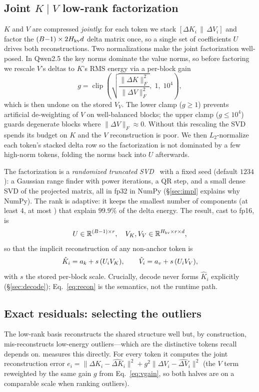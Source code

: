 \subsection{Joint $K\!\mid\!V$ low-rank factorization}
$K$ and $V$ are compressed \emph{jointly}: for each token we stack $[\Delta K_i \,\|\, \Delta V_i]$
and factor the $(B{-}1)\times 2H_{\mathrm{kv}}d$ delta matrix once, so a single set of coefficients
$U$ drives both reconstructions. Two normalizations make the joint factorization well-posed. In
Qwen2.5 the key norms dominate the value norms, so before factoring we rescale $V$'s deltas to
$K$'s RMS energy via a per-block gain
\begin{equation}
  g = \operatorname{clip}\!\left(\sqrt{\frac{\|\Delta K\|_F^2}{\|\Delta V\|_F^2}},\;1,\;10^4\right),
  \label{eq:vgain}
\end{equation}
which is then undone on the stored $V_V$. The lower clamp ($g\ge 1$) prevents artificial
de-weighting of $V$ on well-balanced blocks; the upper clamp ($g\le 10^4$) guards degenerate
blocks where $\|\Delta V\|_F\approx 0$. Without this rescaling the SVD spends its budget on $K$
and the $V$ reconstruction is poor. We then $L_2$-normalize each token's stacked delta row so the
factorization is not dominated by a few high-norm tokens, folding the norms back into $U$ afterwards.

The factorization is a \emph{randomized truncated SVD}~\cite{halko2011randomized} with a fixed
seed (default $1234$): a Gaussian range finder with power iterations, a QR step, and a small dense
SVD of the projected matrix, all in fp32 in NumPy (\S\ref{sec:impl} explains why NumPy). The rank is adaptive: it keeps
the smallest number of components (at least $4$, at most \rank{}) that explain $99.9\%$ of the
delta energy. The result, cast to fp16, is
\begin{equation}
  U\in\mathbb{R}^{(B-1)\times r},\quad V_K,V_V\in\mathbb{R}^{H_{\mathrm{kv}}\times r\times d},
\end{equation}
so that the implicit reconstruction of any non-anchor token is
\begin{equation}
  \hat K_i = a_k + s\,(U_i V_K), \qquad
  \hat V_i = a_v + s\,(U_i V_V),
  \label{eq:recon}
\end{equation}
with $s$ the stored per-block scale. Crucially, decode never forms $\hat K_i$ explicitly
(\S\ref{sec:decode}); Eq.~\eqref{eq:recon} is the semantics, not the runtime path.

\subsection{Exact residuals: selecting the outliers}
The low-rank basis reconstructs the shared structure well but, by construction, mis-reconstructs
low-energy outliers---which are the distinctive tokens recall depends on. \dkv{} measures this
directly. For every token it computes the joint reconstruction error
$e_i = \big\lVert \Delta K_i - \widehat{\Delta K}_i \big\rVert^2 + g^2\big\lVert \Delta V_i -
\widehat{\Delta V}_i\big\rVert^2$ (the $V$ term reweighted by the same gain $g$ from
Eq.~\eqref{eq:vgain}, so both halves are on a comparable scale when ranking outliers).

